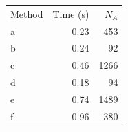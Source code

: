 \begin{tabular}{lrr}
\hline
Method & Time (s) & $N_A$ \\
a & 0.23 & 453 \\
b & 0.24 & 92 \\
c & 0.46 & 1266 \\
d & 0.18 & 94 \\
e & 0.74 & 1489 \\
f & 0.96 & 380 \\
\hline
\end{tabular}
